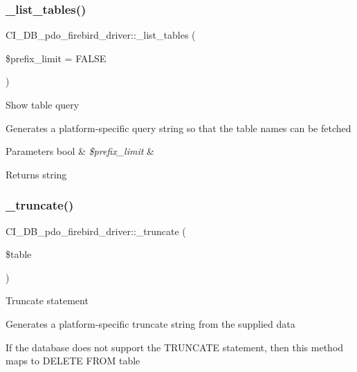 \subsubsection{\texorpdfstring{\+\_\+list\+\_\+tables()}{\_list\_tables()}}
{\footnotesize\ttfamily C\+I\+\_\+\+D\+B\+\_\+pdo\+\_\+firebird\+\_\+driver\+::\+\_\+list\+\_\+tables (\begin{DoxyParamCaption}\item[{}]{\$prefix\+\_\+limit = {\ttfamily FALSE} }\end{DoxyParamCaption})\hspace{0.3cm}{\ttfamily [protected]}}

Show table query

Generates a platform-\/specific query string so that the table names can be fetched


\begin{DoxyParams}[1]{Parameters}
bool & {\em \$prefix\+\_\+limit} & \\
\hline
\end{DoxyParams}
\begin{DoxyReturn}{Returns}
string 
\end{DoxyReturn}
\mbox{\label{class_c_i___d_b__pdo__firebird__driver_a56936c9ecdbe53ea5b5bcfa5a6db0570}} 
\subsubsection{\texorpdfstring{\+\_\+truncate()}{\_truncate()}}
{\footnotesize\ttfamily C\+I\+\_\+\+D\+B\+\_\+pdo\+\_\+firebird\+\_\+driver\+::\+\_\+truncate (\begin{DoxyParamCaption}\item[{}]{\$table }\end{DoxyParamCaption})\hspace{0.3cm}{\ttfamily [protected]}}

Truncate statement

Generates a platform-\/specific truncate string from the supplied data

If the database does not support the T\+R\+U\+N\+C\+A\+TE statement, then this method maps to \textquotesingle{}D\+E\+L\+E\+TE F\+R\+OM table\textquotesingle{}


